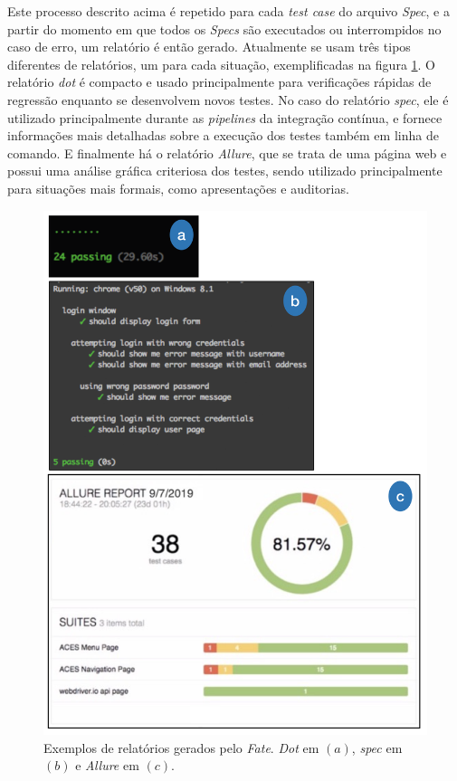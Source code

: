 Este processo descrito acima é repetido para cada \emph{test case} do arquivo \emph{Spec}, e a partir do momento em que todos os \emph{Specs} são executados ou interrompidos no caso de erro, um relatório é então gerado. Atualmente se usam três tipos diferentes de relatórios, um para cada situação, exemplificadas na figura \ref{fig:allure-report}. O relatório \emph{dot} é compacto e usado principalmente para verificações rápidas de regressão enquanto se desenvolvem novos testes. No caso do relatório \emph{spec}, ele é utilizado principalmente durante as \emph{pipelines} da integração contínua, e fornece informações mais detalhadas sobre a execução dos testes também em linha de comando. E finalmente há o relatório \emph{Allure}, que se trata de uma página web e possui uma análise gráfica criteriosa dos testes, sendo utilizado principalmente para situações mais formais, como apresentações e auditorias.

\begin{figure}[H]
    \centering
    \includegraphics[width=13cm]{source/4-solucao/images/fate-reporters-vertical.png}
    \caption{Exemplos de relatórios gerados pelo \emph{Fate}. \emph{Dot} em $(a)$, \emph{spec} em $(b)$ e \emph{Allure} em $(c)$.}
    \label{fig:allure-report}
\end{figure}

